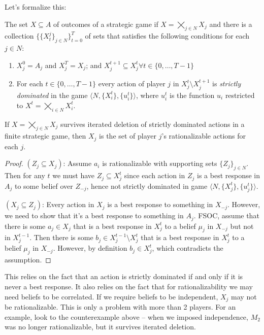 \documentclass[10pt]{article}
\begin{document}
Let's formalize this:
\begin{definition}
	The set $X \subseteq A$ of outcomes of a strategic game  if $X = \bigtimes_{j \in N}X_j$ and there is a collection $\{\{X_t^j\}_{j \in N}\}_{t=0}^T$ of sets that satisfies the following conditions for each $j \in N$:
	\begin{enumerate}
		\item $X_j^0 = A_j$ and $X_j^T = X_j$; and $X_j^{t+1}\subseteq X_j^t \forall t \in \{0,\dots,T-1\}$
		\item For each $t \in \{0,\dots,T-1\}$ every action of player $j$ in $X^t_j \setminus X^{t+1}_j$ is \emph{strictly dominated} in the game $\langle N,\{X_i^t\},\{u_i^t\}\rangle$, where $u^t_i$ is the function $u_i$ restricted to $X^t = \bigtimes_{i\in N}X_i^t$.
	\end{enumerate}
\end{definition}

\begin{proposition}
	If $X = \bigtimes_{j\in N}X_j$ survives iterated deletion of strictly dominated actions in a finite strategic game, then $X_j$ is the set of player $j$'s rationalizable actions for each $j$.
\end{proposition}
\begin{proof}
	$(Z_j \subseteq X_j)$: Assume $a_i$ is rationalizable with supporting sets $\{Z_j\}_{j\in N}$. Then for any $t$ we must have $Z_j \subseteq X^t_j$ since each action in $Z_j$ is a best response in $A_j$ to some belief over $Z_{-j}$, hence not strictly dominated in game $\langle N,\{X_j^t\},\{u^t_j\}\rangle$.
	
	$(X_j \subseteq Z_j)$: Every action in $X_j$ is a best response to something in $X_{-j}$. However, we need to show that it's a best response to something in $A_j$. FSOC, assume that there is some $a_{j} \in X_j$ that is a best response in $X^t_j$ to a belief $\mu_j$ in $X_{-j}$ but not in $X^{t-1}_j$. Then there is some $b_j \in X^{t-1}_j \setminus X^t_j$ that is a best response in $X^t_j$ to a belief $\mu_j$ in $X_{-j}$. However, by definition $b_j \in X^t_j$, which contradicts the assumption.
\end{proof}

\begin{remark}
	This relies on the fact that an action is strictly dominated if and only if it is never a best response. It also relies on the fact that for rationalizability we may need beliefs to be correlated. If we require beliefs to be independent, $X_j$ may not be rationalizable. This is only a problem with more than 2 players. For an example, look to the counterexample above -- when we imposed independence, $M_2$ was no longer rationalizable, but it survives iterated deletion.
\end{remark}
\end{document}
